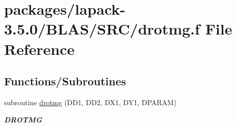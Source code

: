 \hypertarget{lapack-3_85_80_2BLAS_2SRC_2drotmg_8f}{}\section{packages/lapack-\/3.5.0/\+B\+L\+A\+S/\+S\+R\+C/drotmg.f File Reference}
\label{lapack-3_85_80_2BLAS_2SRC_2drotmg_8f}
\subsection*{Functions/\+Subroutines}
\begin{DoxyCompactItemize}
\item 
subroutine \hyperlink{group__double__blas__level1_ga13e351a3dfafa2cd8dc5302dcf53f69a}{drotmg} (D\+D1, D\+D2, D\+X1, D\+Y1, D\+P\+A\+R\+A\+M)
\begin{DoxyCompactList}\small\item\em {\bfseries D\+R\+O\+T\+M\+G} \end{DoxyCompactList}\end{DoxyCompactItemize}
